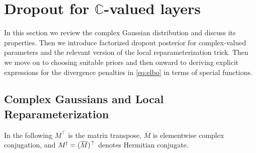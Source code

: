 \documentclass[a4paper,10pt]{article}
\newcommand{\cplx}{\mathbb{C}}
\newcommand{\hop}{{\mkern-1.5mu\dagger}}
\newcommand{\conj}[1]{\overline{#1}}
\begin{document}


\section{Dropout for $\cplx$-valued layers} %
\label{sec:dropout_for_c_valued_layers}

In this section we review the complex Gaussian distribution and discuss its properties. Then
we introduce factorized dropout posterior for complex-valued parameters and the relevant
version of the local reparameterization trick. Then we move on to choosing suitable priors
and then onward to deriving explicit expressions for the divergence penalties in \eqref{eq:elbo}
in terms of special functions.

\subsection{Complex Gaussians and Local Reparameterization} %
\label{sub:c_gauss_and_local_rep}

In the following $M^{\top}$ is the matrix transpose, $\conj{M}$ is elementwise complex
conjugation, and $M^{\hop} = (\conj{M})^\top$ denotes Hermitian conjugate.
\end{document}
